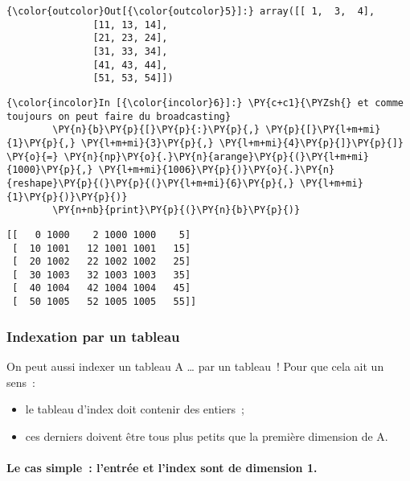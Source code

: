\begin{Verbatim}[commandchars=\\\{\},frame=single,framerule=0.3mm,rulecolor=\color{cellframecolor}]
{\color{outcolor}Out[{\color{outcolor}5}]:} array([[ 1,  3,  4],
               [11, 13, 14],
               [21, 23, 24],
               [31, 33, 34],
               [41, 43, 44],
               [51, 53, 54]])
\end{Verbatim}
            
    \begin{Verbatim}[commandchars=\\\{\},frame=single,framerule=0.3mm,rulecolor=\color{cellframecolor}]
{\color{incolor}In [{\color{incolor}6}]:} \PY{c+c1}{\PYZsh{} et comme toujours on peut faire du broadcasting}
        \PY{n}{b}\PY{p}{[}\PY{p}{:}\PY{p}{,} \PY{p}{[}\PY{l+m+mi}{1}\PY{p}{,} \PY{l+m+mi}{3}\PY{p}{,} \PY{l+m+mi}{4}\PY{p}{]}\PY{p}{]} \PY{o}{=} \PY{n}{np}\PY{o}{.}\PY{n}{arange}\PY{p}{(}\PY{l+m+mi}{1000}\PY{p}{,} \PY{l+m+mi}{1006}\PY{p}{)}\PY{o}{.}\PY{n}{reshape}\PY{p}{(}\PY{p}{(}\PY{l+m+mi}{6}\PY{p}{,} \PY{l+m+mi}{1}\PY{p}{)}\PY{p}{)}
        \PY{n+nb}{print}\PY{p}{(}\PY{n}{b}\PY{p}{)}
\end{Verbatim}


    \begin{Verbatim}[commandchars=\\\{\},frame=single,framerule=0.3mm,rulecolor=\color{cellframecolor}]
[[   0 1000    2 1000 1000    5]
 [  10 1001   12 1001 1001   15]
 [  20 1002   22 1002 1002   25]
 [  30 1003   32 1003 1003   35]
 [  40 1004   42 1004 1004   45]
 [  50 1005   52 1005 1005   55]]
\end{Verbatim}

    \hypertarget{indexation-par-un-tableau}{%
\subsubsection{Indexation par un
tableau}\label{indexation-par-un-tableau}}

    On peut aussi indexer un tableau A \ldots{} par un tableau~! Pour que
cela ait un sens~:

\begin{itemize}
\tightlist
\item
  le tableau d'index doit contenir des entiers~;
\item
  ces derniers doivent être tous plus petits que la première dimension
  de A.
\end{itemize}

    \hypertarget{le-cas-simple-lentruxe9e-et-lindex-sont-de-dimension-1.}{%
\paragraph{Le cas simple~: l'entrée et l'index sont de dimension
1.}\label{le-cas-simple-lentruxe9e-et-lindex-sont-de-dimension-1.}}

